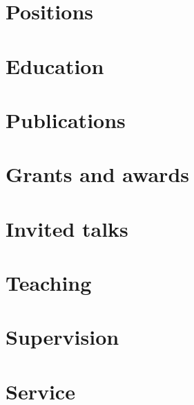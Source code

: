 \documentclass[11pt,a4paper]{article}
\begin{document}
\par

\par

\section*{Positions}
\par

\section*{Education}
\par

\section*{Publications}
\par

\section*{Grants and awards}
\par

\section*{Invited talks}
\par

\section*{Teaching}
\par

\section*{Supervision}
\par

\section*{Service}
\par
\end{document}
